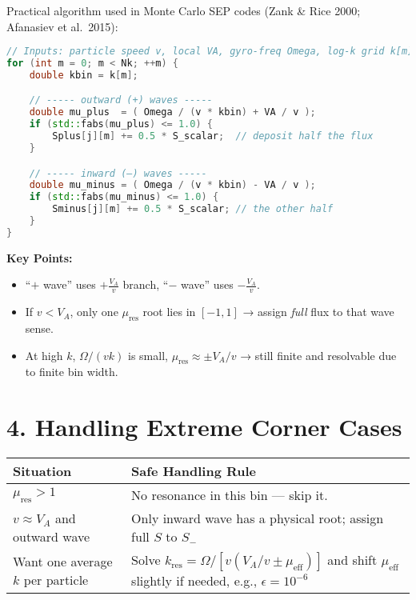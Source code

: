 Practical algorithm used in Monte Carlo SEP codes (Zank \& Rice 2000; Afanasiev et al.\ 2015):

\begin{lstlisting}[language=C++,basicstyle=\ttfamily\small]
// Inputs: particle speed v, local VA, gyro-freq Omega, log-k grid k[m]
for (int m = 0; m < Nk; ++m) {
    double kbin = k[m];

    // ----- outward (+) waves -----
    double mu_plus  = ( Omega / (v * kbin) + VA / v );
    if (std::fabs(mu_plus) <= 1.0) {
        Splus[j][m] += 0.5 * S_scalar;  // deposit half the flux
    }

    // ----- inward (–) waves -----
    double mu_minus = ( Omega / (v * kbin) - VA / v );
    if (std::fabs(mu_minus) <= 1.0) {
        Sminus[j][m] += 0.5 * S_scalar; // the other half
    }
}
\end{lstlisting}

\textbf{Key Points:}
\begin{itemize}
    \item ``$+$ wave'' uses $+\frac{V_A}{v}$ branch, ``$-$ wave'' uses $-\frac{V_A}{v}$.
    \item If $v < V_A$, only one $\mu_{\text{res}}$ root lies in $[-1,1]$ → assign \textit{full} flux to that wave sense.
    \item At high $k$, $\Omega / (vk)$ is small, $\mu_{\text{res}} \approx \pm V_A/v$ → still finite and resolvable due to finite bin width.
\end{itemize}

\section*{4. Handling Extreme Corner Cases}

\begin{center}
\begin{tabular}{p{6cm} p{9cm}}
\toprule
\textbf{Situation} & \textbf{Safe Handling Rule} \\
\midrule
$\mu_{\text{res}} > 1$ & No resonance in this bin — skip it. \\
$v \approx V_A$ and outward wave & Only inward wave has a physical root; assign full $S$ to $S_-$ \\
Want one average $k$ per particle & Solve $k_{\text{res}} = \Omega / [v (V_A/v \pm \mu_{\text{eff}})]$ and shift $\mu_{\text{eff}}$ slightly if needed, e.g., $\epsilon = 10^{-6}$ \\
\bottomrule
\end{tabular}
\end{center}

